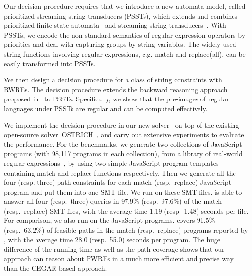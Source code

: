 {%
Our decision procedure requires that we introduce a new automata model, called
prioritized streaming string transducers (PSSTs), which extends and combines
prioritized finite-state automata~\cite{BM17} and streaming string transducers~\cite{AC10,AD11}. With PSSTs, we encode the non-standard semantics of regular
expression operators by priorities and deal with capturing groups by string variables.
The widely used string functions involving regular expressions, e.g. match and replace(all), can be easily transformed into PSSTs.

We then design a decision procedure for a class of string constraints with RWREs. The decision procedure extends the backward reasoning approach proposed in~\cite{CHL+19} to PSSTs. Specifically, we show that the pre-images of regular languages under PSSTs are regular and can be computed effectively.

We implement the decision procedure in our new solver \ostrich\
on top of the existing open-source solver~OSTRICH~\cite{CHL+19},
 and carry out extensive experiments to evaluate the performance. For the benchmarks, we generate two collections of JavaScript programs (with 98,117 programs in each collection), from a library of real-world regular expressions~\cite{DMC+19}, by using two simple JavaScript program templates containing match and replace functions respectively.
 Then we generate all the four (resp. three) path constraints for each match (resp.\ replace) JavaScript program and put them into one SMT file. We run {\ostrich} on these SMT files. {\ostrich} is able to answer all four (resp.\ three) queries in 97.9\% (resp.\ 97.6\%) of the match (resp.\ replace) SMT files, with the average time 1.19 (resp.\ 1.48) seconds per file. For comparison, we also run \expose{} on the JavaScript programs. \expose{} covers 91.5\% (resp.\ 63.2\%) of feasible paths in the match (resp.\ replace) programs reported by {\ostrich}, with  the average time 28.0 (resp.\ 55.0) seconds per program. The huge difference of the running time as well as the path coverage shows that our approach can reason about RWREs in a much more efficient and precise way than the CEGAR-based approach.
 }



